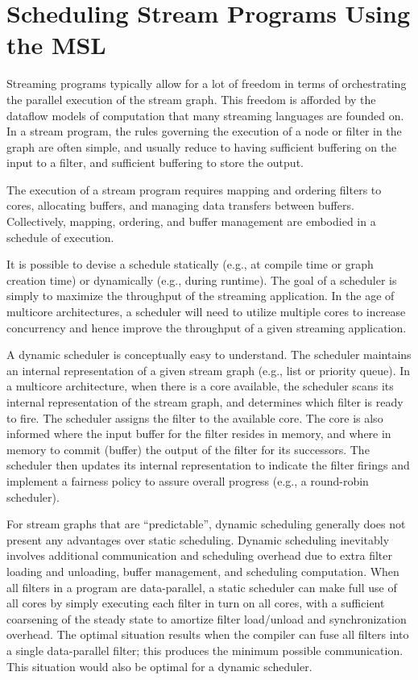 \section{Scheduling Stream Programs Using the MSL}\label{ch:ds}

Streaming programs typically allow for a lot of freedom in terms of
orchestrating the parallel execution of the stream graph. This freedom is
afforded by the dataflow models of computation that many streaming
languages are founded on. In a stream program, the rules governing the
execution of a node or filter in the graph are often simple, and usually
reduce to having sufficient buffering on the input to a filter, and
sufficient buffering to store the output.

The execution of a stream program requires mapping and ordering filters
to cores, allocating buffers, and managing data transfers between
buffers. Collectively, mapping, ordering, and buffer management are
embodied in a schedule of execution.

It is possible to devise a schedule statically (e.g., at compile time or
graph creation time) or dynamically (e.g., during runtime). The goal of a
scheduler is simply to maximize the throughput of the streaming
application. In the age of multicore architectures, a scheduler will
need to utilize multiple cores to increase concurrency and hence improve
the throughput of a given streaming application. 

A dynamic scheduler is conceptually easy to understand. The scheduler
maintains an internal representation of a given stream graph (e.g.,
list or priority queue). In a multicore architecture, when there is a
core available, the scheduler scans its internal representation of the
stream graph, and determines which filter is ready to fire.
The scheduler assigns the filter to the available core. The core is
also informed where the input buffer for the filter resides in memory,
and where in memory to commit (buffer) the output of the filter for its
successors. The scheduler then updates its internal representation to
indicate the filter firings and implement a fairness policy to assure
overall progress (e.g., a round-robin scheduler).

For stream graphs that are ``predictable'', dynamic scheduling
generally does not present any advantages over static
scheduling. Dynamic scheduling inevitably involves additional
communication and scheduling overhead due to extra filter loading and
unloading, buffer management, and scheduling computation. When all
filters in a program are data-parallel, a static scheduler can make
full use of all cores by simply executing each filter in turn on all
cores, with a sufficient coarsening of the steady state to amortize
filter load/unload and synchronization overhead. The optimal
situation results when the compiler can fuse all filters into a single
data-parallel filter; this produces the minimum possible communication.
This situation would also be optimal for a dynamic scheduler.

